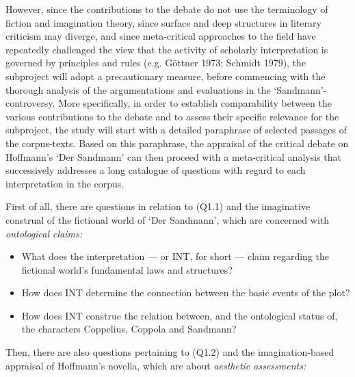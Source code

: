 However, since the contributions to the debate do not use the terminology of fiction and imagination theory, since surface and deep structures in literary criticism may diverge, and since meta-critical approaches to the field have repeatedly challenged the view that the activity of scholarly interpretation is governed by principles and rules (e.g. G\"ottner 1973; Schmidt 1979), the subproject will adopt a precautionary measure, before commencing with the thorough analysis of the argumentations and evaluations in the `Sandmann'-controversy. More specifically, in order to establish comparability between the various contributions to the debate and to assess their specific relevance for the subproject, the study will start with a detailed paraphrase of selected passages of the corpus-texts. Based on this paraphrase, the appraisal of the critical debate on Hoffmann's `Der Sandmann' can then proceed with a meta-critical analysis that successively addresses a long catalogue of questions with regard to each interpretation in the corpus.

First of all, there are questions in relation to (Q1.1) and the imaginative construal of the fictional world of `Der Sandmann', which are concerned with \emph{ontological claims:}

\vspace{-.1cm}
\begin{itemize}[leftmargin=2cm]
\item What does the interpretation --- or INT, for short --- claim regarding the fictional world’s fundamental laws and structures?
\vspace{-.1cm}
\item How does INT determine the connection between the basic events of the plot?
\vspace{-.1cm}
\item How does INT construe the relation between, and the ontological status of, the characters Coppelius, Coppola and Sandmann? 
\end{itemize}
\vspace{-.3cm}

\noindent Then, there are also questions pertaining to (Q1.2) and the imagination-based appraisal of Hoffmann's novella, which are about \emph{aesthetic assessments:}

